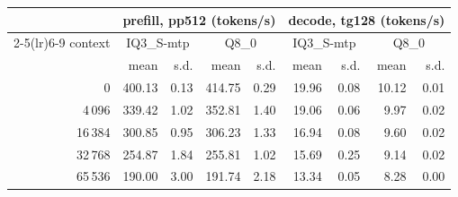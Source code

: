 \begin{tabular}{r rr rr rr rr}
\toprule
 & \multicolumn{4}{c}{prefill, pp512 (tokens/s)} & \multicolumn{4}{c}{decode, tg128 (tokens/s)} \\
\cmidrule(lr){2-5}\cmidrule(lr){6-9}
context & \multicolumn{2}{c}{IQ3\_S-mtp} & \multicolumn{2}{c}{Q8\_0} & \multicolumn{2}{c}{IQ3\_S-mtp} & \multicolumn{2}{c}{Q8\_0} \\
 & mean & s.d. & mean & s.d. & mean & s.d. & mean & s.d. \\
\midrule
0 & 400.13 & 0.13 & 414.75 & 0.29 & 19.96 & 0.08 & 10.12 & 0.01 \\
4\,096 & 339.42 & 1.02 & 352.81 & 1.40 & 19.06 & 0.06 & 9.97 & 0.02 \\
16\,384 & 300.85 & 0.95 & 306.23 & 1.33 & 16.94 & 0.08 & 9.60 & 0.02 \\
32\,768 & 254.87 & 1.84 & 255.81 & 1.02 & 15.69 & 0.25 & 9.14 & 0.02 \\
65\,536 & 190.00 & 3.00 & 191.74 & 2.18 & 13.34 & 0.05 & 8.28 & 0.00 \\
\bottomrule
\end{tabular}
